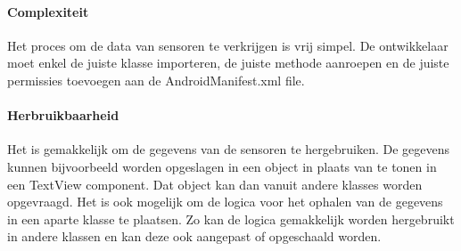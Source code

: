\paragraph{Complexiteit}
Het proces om de data van sensoren te verkrijgen is vrij simpel. De ontwikkelaar moet enkel de juiste klasse importeren, 
de juiste methode aanroepen en de juiste permissies toevoegen aan de AndroidManifest.xml file.

\paragraph{Herbruikbaarheid}
Het is gemakkelijk om de gegevens van de sensoren te hergebruiken. De gegevens kunnen bijvoorbeeld 
worden opgeslagen in een object in plaats van te tonen in een TextView component. Dat object kan dan vanuit 
andere klasses worden opgevraagd. Het is ook mogelijk om de logica voor het ophalen van de gegevens
in een aparte klasse te plaatsen. Zo kan de logica gemakkelijk worden hergebruikt in andere klassen en 
kan deze ook aangepast of opgeschaald worden.
